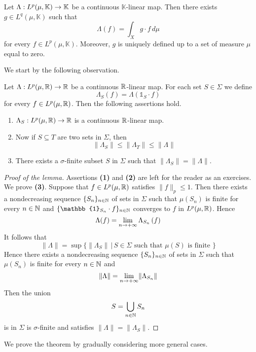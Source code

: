 \begin{theorem}\label{theorem:dual_to_L_p_for_p_in_(1_00)}
Let $\Lambda:L^p(\mu,\mathbb{K})\rightarrow \mathbb{K}$ be a continuous $\mathbb{K}$-linear map. Then there exists $g \in L^q(\mu,\mathbb{K})$ such that 
$$\Lambda(f) = \int_Xg\cdot f\,d\mu$$
for every $f \in L^p(\mu,\mathbb{K})$. Moreover, $g$ is uniquely defined up to a set of measure $\mu$ equal to zero.
\end{theorem}
\noindent
We start by the following observation.

\begin{lemma}\label{lemma:restriction_of_functionals_lemma}
Let $\Lambda:L^p(\mu,{\mathbb R})\rightarrow {\mathbb R}$ be a continuous ${\mathbb R}$-linear map. For each set $S \in \Sigma$ we define
$$\Lambda_S(f) = \Lambda\left(\mathbb{1}_S\cdot f\right)$$
for every $f \in L^p(\mu,{\mathbb R})$. Then the following assertions hold.
\begin{enumerate}[label=\emph{\textbf{(\arabic*)}}, leftmargin=*]
\item $\Lambda_S:L^p(\mu,{\mathbb R})\rightarrow {\mathbb R}$ is a continuous ${\mathbb R}$-linear map.
\item Now if $S\subseteq T$ are two sets in $\Sigma$, then
$$\lVert \Lambda_S\rVert \leq \lVert \Lambda_T\rVert \leq \lVert \Lambda \rVert$$
\item There exists a $\sigma$-finite subset $S$ in $\Sigma$ such that $\lVert \Lambda_S\rVert = \lVert \Lambda \rVert$.
\end{enumerate}  
\end{lemma}
\begin{proof}[Proof of the lemma]
Assertions \textbf{(1)} and \textbf{(2)} are left for the reader as an exercises.\\
We prove \textbf{(3)}. Suppose that $f \in L^p(\mu, {\mathbb R})$ satisfies $\lVert f \rVert_p \leq 1$. Then there exists a nondecreasing sequence $\{S_n\}_{n\in {\mathbb N}}$ of sets in $\Sigma$ such that $\mu(S_n)$ is finite for every $n\in {\mathbb N}$ and $\{\mathbb{1}_{S_n}\cdot f\}_{n\in \NN}$ converges to $f$ in $L^p(\mu, {\mathbb R})$. Hence 
$$\Lambda(f) = \lim_{n\rightarrow +\infty}\Lambda_{S_n}\left(f\right)$$
It follows that
$$\lVert \Lambda \rVert = \sup \big\{\lVert \Lambda_S \rVert\,\big|\,S\in \Sigma\mbox{ such that }\mu(S)\mbox{ is finite }\}$$
Hence there exists a nondecreasing sequence $\{S_n\}_{n\in {\mathbb N}}$ of sets in $\Sigma$ such that $\mu(S_n)$ is finite for every $n\in {\mathbb N}$ and 
$$\lVert \Lambda \rVert = \lim_{n\rightarrow +\infty}\lVert \Lambda_{S_n} \rVert$$
Then the union
$$S = \bigcup_{n \in {\mathbb N}}S_n$$
is in $\Sigma$ is $\sigma$-finite and satisfies $\lVert \Lambda \rVert = \lVert \Lambda_S\rVert$. 
\end{proof}
\noindent
We prove the theorem by gradually considering more general cases.

